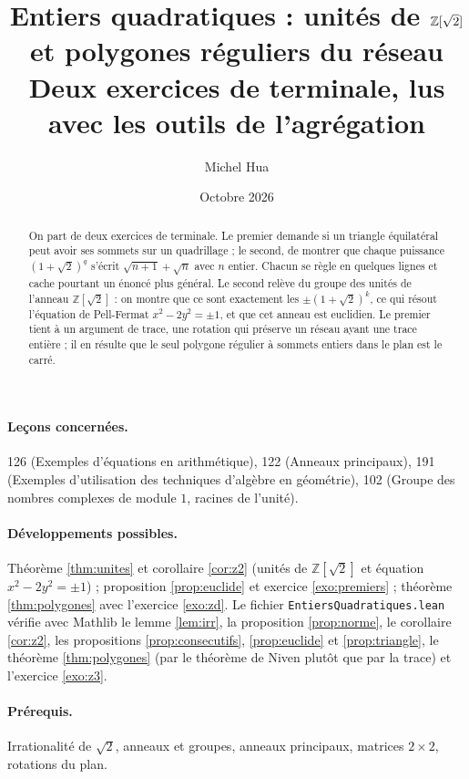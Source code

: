 \documentclass[11pt,a4paper]{article}
\title{Entiers quadratiques : unités de $\Z[\sqrt2]$\\ et polygones réguliers du réseau\\[2pt]
\large Deux exercices de terminale, lus avec les outils de l'agrégation}
\author{Michel Hua}
\date{Octobre 2026}
\theoremstyle{plain}
\theoremstyle{definition}
\theoremstyle{remark}
\newcommand{\Z}{\mathbb{Z}}
\begin{document}
\maketitle

\begin{abstract}
On part de deux exercices de terminale. Le premier demande si un triangle équilatéral peut avoir ses sommets sur un quadrillage ; le second, de montrer que chaque puissance $(1+\sqrt2)^q$ s'écrit $\sqrt{n+1}+\sqrt n$ avec $n$ entier. Chacun se règle en quelques lignes et cache pourtant un énoncé plus général. Le second relève du groupe des unités de l'anneau $\Z[\sqrt2]$ : on montre que ce sont exactement les $\pm(1+\sqrt2)^k$, ce qui résout l'équation de Pell-Fermat $x^2-2y^2=\pm1$, et que cet anneau est euclidien. Le premier tient à un argument de trace, une rotation qui préserve un réseau ayant une trace entière ; il en résulte que le seul polygone régulier à sommets entiers dans le plan est le carré.
\end{abstract}

\paragraph{Leçons concernées.} 126 (Exemples d'équations en arithmétique), 122 (Anneaux principaux), 191 (Exemples d'utilisation des techniques d'algèbre en géométrie), 102 (Groupe des nombres complexes de module $1$, racines de l'unité).

\paragraph{Développements possibles.} Théorème \ref{thm:unites} et corollaire \ref{cor:z2} (unités de $\Z[\sqrt2]$ et équation $x^2-2y^2=\pm1$) ; proposition \ref{prop:euclide} et exercice \ref{exo:premiers} ; théorème \ref{thm:polygones} avec l'exercice \ref{exo:zd}. Le fichier \texttt{EntiersQuadratiques.lean} vérifie avec Mathlib le lemme \ref{lem:irr}, la proposition \ref{prop:norme}, le corollaire \ref{cor:z2}, les propositions \ref{prop:consecutifs}, \ref{prop:euclide} et \ref{prop:triangle}, le théorème \ref{thm:polygones} (par le théorème de Niven plutôt que par la trace) et l'exercice \ref{exo:z3}.

\paragraph{Prérequis.} Irrationalité de $\sqrt2$, anneaux et groupes, anneaux principaux, matrices $2\times2$, rotations du plan.
\end{document}
